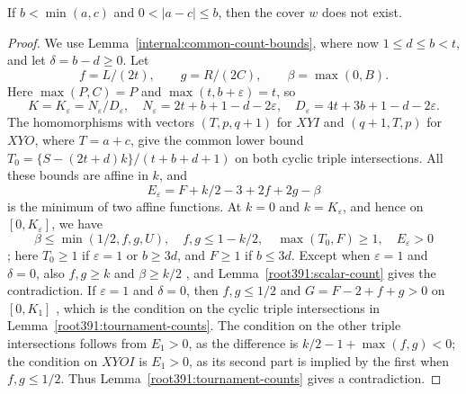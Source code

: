 \begin{lemma}
\label{smallmiddle:moderate}
If $b<\min(a,c)$ and $0<|a-c|\le b$, then the cover $w$ does not exist.
\end{lemma}
\begin{proof}
We use Lemma~\ref{internal:common-count-bounds}, where now $1\le d\le b<t$,
and let $\delta=b-d\ge0$. Let
\begin{equation}\label{smallmiddle:upper-floors}
 f=L/(2t),\qquad g=R/(2C),\qquad\beta=\max(0,B).
\end{equation}
Here $\max(P,C)=P$ and $\max(t,b+\varepsilon)=t$, so
\begin{equation}\label{smallmiddle:upper-K}
 K=K_\varepsilon=N_\varepsilon/D_\varepsilon,
 \quad N_\varepsilon=2t+b+1-d-2\varepsilon,
 \quad D_\varepsilon=4t+3b+1-d-2\varepsilon.
\end{equation}
The homomorphisms with vectors $(T,p,q+1)$ for $XYI$ and $(q+1,T,p)$ for $XYO$,
where $T=a+c$, give the common lower bound
$T_0=\{S-(2t+d)k\}/(t+b+d+1)$ on both cyclic triple intersections.
All these bounds are affine in $k$, and
\begin{equation}\label{smallmiddle:E}
 E_\varepsilon=F+k/2-3+2f+2g-\beta
\end{equation}
is the minimum of two affine functions. At $k=0$ and $k=K_\varepsilon$,
and hence on $[0,K_\varepsilon]$, we have
\[
 \beta\le\min(1/2,f,g,U),\quad f,g\le1-k/2,\quad
 \max(T_0,F)\ge1,\quad E_\varepsilon>0
\]
; here $T_0\ge1$ if $\varepsilon=1$ or $b\ge3d$, and $F\ge1$ if $b\le3d$.
Except when $\varepsilon=1$ and $\delta=0$, also $f,g\ge k$ and
$\beta\ge k/2$ , and Lemma~\ref{root391:scalar-count} gives the
contradiction.
If $\varepsilon=1$ and $\delta=0$, then $f,g\le1/2$ and
$G=F-2+f+g>0$ on $[0,K_1]$ , which is the condition on the cyclic triple intersections in Lemma~\ref{root391:tournament-counts}.
The condition on the other triple intersections follows from $E_1>0$, as the difference is $k/2-1+\max(f,g)<0$; the condition on $XYOI$ is $E_1>0$,
as its second part is implied by the first when $f,g\le1/2$.
Thus Lemma~\ref{root391:tournament-counts} gives a contradiction.
\end{proof}

